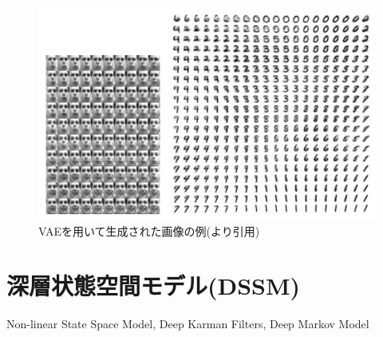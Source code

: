 \begin{figure}[tbp]
  \begin{center}
    \includegraphics[width=\linewidth]{./figures/vae.png}
    \caption{VAEを用いて生成された画像の例(\cite{vae}より引用)}
    \label{fig:vae}
  \end{center}
\end{figure}

\section{深層状態空間モデル(DSSM)}
\label{section:DSSM}

Non-linear State Space Model, Deep Karman Filters, Deep Markov Model